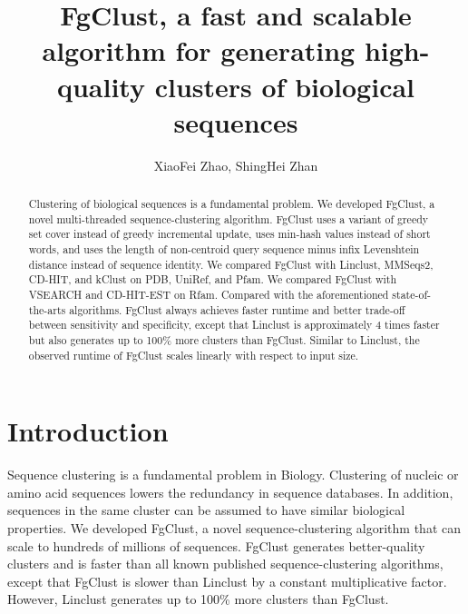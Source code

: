 \documentclass[11pt,letterpaper]{article}
\title{FgClust, a fast and scalable algorithm for generating high-quality clusters of biological sequences}
\author{XiaoFei Zhao, ShingHei Zhan}
\begin{document}
\maketitle

\begin{abstract}
Clustering of biological sequences is a fundamental problem.
We developed FgClust, a novel multi-threaded sequence-clustering algorithm.
FgClust uses a variant of greedy set cover instead of greedy incremental update, uses min-hash values instead of short words, and uses the length of non-centroid query sequence minus infix Levenshtein distance instead of sequence identity.
We compared FgClust with Linclust, MMSeqs2, CD-HIT, and kClust
on PDB, UniRef, and Pfam.
We compared FgClust with VSEARCH and CD-HIT-EST on Rfam.
Compared with the aforementioned state-of-the-arts algorithms.
FgClust always achieves faster runtime and better trade-off between sensitivity and specificity, except that Linclust is approximately 4 times faster but also generates up to 100\% more clusters than FgClust.
Similar to Linclust, the observed runtime of FgClust scales linearly with respect to input size.
\end{abstract}

\section{Introduction}

Sequence clustering is a fundamental problem in Biology.
Clustering of nucleic or amino acid sequences lowers the redundancy in sequence databases.
In addition, sequences in the same cluster can be assumed to have similar biological properties.
We developed FgClust, a novel sequence-clustering algorithm that can scale to hundreds of millions of sequences.
FgClust generates better-quality clusters and is faster than all known published sequence-clustering algorithms, except that FgClust is slower than Linclust by a constant multiplicative factor.
However, Linclust generates up to 100\% more clusters than FgClust.

\end{document}
